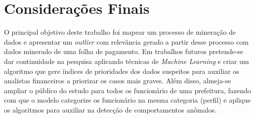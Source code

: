 \documentclass[12pt]{article}
\begin{document}
\section{Considerações Finais}

O principal objetivo deste trabalho foi mapear um processo de mineração de dados e apresentar um \textit{outlier} com relevância gerado a partir desse processo com dados minerado de uma folha de pagamento. Em trabalhos futuros pretende-se dar continuidade na pesquisa aplicando técnicas de \textit{Machine Learning} e criar um algoritmo que gere índices de prioridades dos dados suspeitos para auxiliar os analistas financeiros a priorizar os casos mais graves. Além disso, almeja-se ampliar o público do estudo para todos os funcionário de uma prefeitura, fazendo com que o modelo categorize os funcionário na mesma categoria (perfil) e aplique os algoritmos para auxiliar na detecção de comportamentos anômalos.



\end{document}
